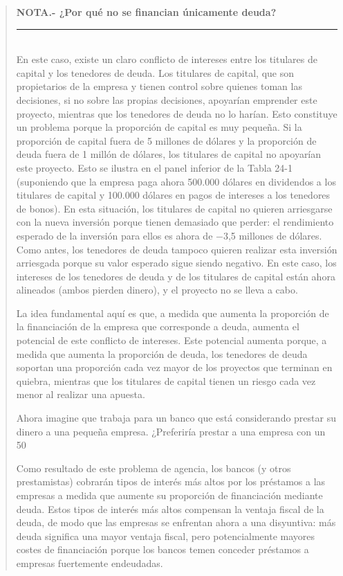 \documentclass[10pt,a4paper]{article}
\newenvironment{specialblock}[1]{%
      \begin{quote} %
      \small %
      \noindent\textbf{#1}\\[-0.3em] %
      \rule{\linewidth}{0.4pt}\\[0.6em]}{
      \end{quote}}
\begin{document}
\begin{specialblock}{\textbf{NOTA.-} ¿Por qué no se financian únicamente deuda?}
    En este caso, existe un claro conflicto de intereses entre los titulares de capital y los tenedores de deuda. Los titulares de capital, que son propietarios de la empresa y tienen control sobre quienes toman las decisiones, si no sobre las propias decisiones, apoyarían emprender este proyecto, mientras que los tenedores de deuda no lo harían. Esto constituye un problema porque la proporción de capital es muy pequeña. Si la proporción de capital fuera de 5 millones de dólares y la proporción de deuda fuera de 1 millón de dólares, los titulares de capital no apoyarían este proyecto. Esto se ilustra en el panel inferior de la Tabla 24-1 (suponiendo que la empresa paga ahora 500.000 dólares en dividendos a los titulares de capital y 100.000 dólares en pagos de intereses a los tenedores de bonos). En esta situación, los titulares de capital no quieren arriesgarse con la nueva inversión porque tienen demasiado que perder: el rendimiento esperado de la inversión para ellos es ahora de −3,5 millones de dólares. Como antes, los tenedores de deuda tampoco quieren realizar esta inversión arriesgada porque su valor esperado sigue siendo negativo. En este caso, los intereses de los tenedores de deuda y de los titulares de capital están ahora alineados (ambos pierden dinero), y el proyecto no se lleva a cabo.
    
    La idea fundamental aquí es que, a medida que aumenta la proporción de la financiación de la empresa que corresponde a deuda, aumenta el potencial de este conflicto de intereses. Este potencial aumenta porque, a medida que aumenta la proporción de deuda, los tenedores de deuda soportan una proporción cada vez mayor de los proyectos que terminan en quiebra, mientras que los titulares de capital tienen un riesgo cada vez menor al realizar una apuesta.
    
    Ahora imagine que trabaja para un banco que está considerando prestar su dinero a una pequeña empresa. ¿Preferiría prestar a una empresa con un 50 %
    
    Como resultado de este problema de agencia, los bancos (y otros prestamistas) cobrarán tipos de interés más altos por los préstamos a las empresas a medida que aumente su proporción de financiación mediante deuda. Estos tipos de interés más altos compensan la ventaja fiscal de la deuda, de modo que las empresas se enfrentan ahora a una disyuntiva: más deuda significa una mayor ventaja fiscal, pero potencialmente mayores costes de financiación porque los bancos temen conceder préstamos a empresas fuertemente endeudadas.


\end{specialblock}
\end{document}

